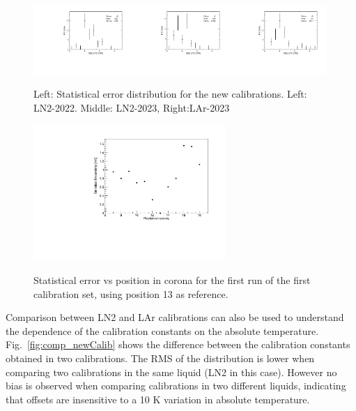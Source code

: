 \begin{figure}[htbp]
\centering
{\includegraphics[width=0.33\textwidth]{images/figure_17_a.pdf}}{\includegraphics[width=0.33\textwidth]{images/figure_17_b.pdf}}{\includegraphics[width=0.33\textwidth]{images/figure_17_c.pdf}}
\caption{Left: Statistical error distribution for the new calibrations. Left: LN2-2022. Middle: LN2-2023, Right:LAr-2023}
\label{fig:newCalib_stat}
\end{figure}

\begin{figure}[htbp]
\centering
{\includegraphics[width=0.65\textwidth]{images/figure_18.pdf}}
\caption{Statistical error vs position in corona for the first run of the first calibration set, using position 13 as reference.}
\label{fig:newCalib_statVsChannel}
\end{figure}

Comparison between LN2 and LAr calibrations can also be used to understand the dependence of the calibration constants on the absolute temperature. Fig.~\ref{fig:comp_newCalib} shows the difference between the calibration constants obtained in two calibrations. The RMS of the distribution is lower when comparing two calibrations in the same liquid (LN2 in this case). However no bias is observed when comparing calibrations in two different liquids, indicating that offsets are insensitive to a 10 K variation in absolute temperature.  

